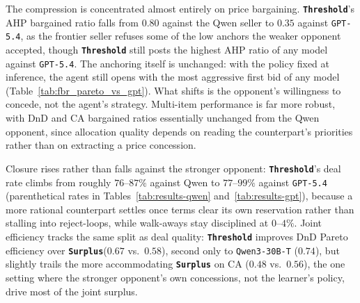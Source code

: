 \documentclass{interact}
\theoremstyle{plain}
\theoremstyle{definition}
\theoremstyle{remark}
\newcommand{\model}[1]{\texttt{#1}}
\newcommand{\Threshold}{\textbf{\texttt{Threshold}}\xspace}
\newcommand{\Surplus}{\textbf{\texttt{Surplus}}\xspace}
\begin{document}
The compression is concentrated almost entirely on price bargaining. \Threshold's AHP bargained ratio falls from $0.80$ against the Qwen seller to $0.35$ against \model{GPT-5.4}, as the frontier seller refuses some of the low anchors the weaker opponent accepted, though \Threshold still posts the highest AHP ratio of any model against \model{GPT-5.4}. The anchoring itself is unchanged: with the policy fixed at inference, the agent still opens with the most aggressive first bid of any model (Table~\ref{tab:fbr_pareto_vs_gpt}). What shifts is the opponent's willingness to concede, not the agent's strategy. Multi-item performance is far more robust, with DnD and CA bargained ratios essentially unchanged from the Qwen opponent, since allocation quality depends on reading the counterpart's priorities rather than on extracting a price concession.

Closure rises rather than falls against the stronger opponent: \Threshold's deal rate climbs from roughly $76$--$87\%$ against Qwen to $77$--$99\%$ against \model{GPT-5.4} (parenthetical rates in Tables~\ref{tab:results-qwen} and~\ref{tab:results-gpt}), because a more rational counterpart settles once terms clear its own reservation rather than stalling into reject-loops, while walk-aways stay disciplined at $0$--$4\%$. Joint efficiency tracks the same split as deal quality: \Threshold improves DnD Pareto efficiency over \Surplus ($0.67$ vs.\ $0.58$), second only to \model{Qwen3-30B-T} ($0.74$), but slightly trails the more accommodating \Surplus on CA ($0.48$ vs.\ $0.56$), the one setting where the stronger opponent's own concessions, not the learner's policy, drive most of the joint surplus.
\end{document}
